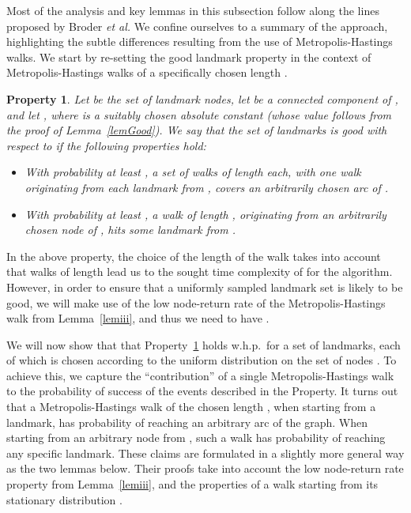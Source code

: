 \documentclass[11pt,a4paper]{article}
\newtheorem{property}{Property}
\newcommand{\Broder}{Broder \etal}
\newcommand{\etal}{\textsl{et al.}\xspace}
\renewcommand{\*}{\hspace*{5mm}}
\begin{document}
Most of the analysis and key lemmas in this subsection follow along the lines proposed by \Broder We confine ourselves to a summary of the approach, highlighting the subtle differences resulting from the use of Metropolis-Hastings walks. We start by re-setting the good landmark property in the context of Metropolis-Hastings walks  of a specifically chosen length .

\begin{property}\label{begood}
Let  be the set of  landmark nodes, let  be a connected component of , and let , where  is a suitably chosen absolute constant (whose value follows from the proof of Lemma~\ref{lemGood}). We say that the set of landmarks  is \emph{good with respect to } if the following properties hold:
\begin{itemize}
\item With probability at least , a set of  walks  of length  each, with one walk originating from each landmark from , covers an arbitrarily chosen arc of .
\item With probability at least , a walk  of length , originating from an arbitrarily chosen node of , hits some landmark from .
\end{itemize}
\end{property}

In the above property, the choice of the length  of the walk takes into account that walks of length  lead us to the sought time complexity of  for the algorithm. However, in order to ensure that a uniformly sampled landmark set is likely to be good, we will make use of the low node-return rate of the Metropolis-Hastings walk from Lemma~\ref{lemiii}, and thus we need to have .

We will now show that that Property~\ref{begood} holds w.h.p.\ for a set of landmarks, each of which is chosen according to the uniform distribution  on the set of nodes . To achieve this, we capture the ``contribution'' of a single Metropolis-Hastings walk to the probability of success of the events described in the Property. It turns out that a Metropolis-Hastings walk  of the chosen length , when starting from a landmark, has probability  of reaching an arbitrary arc of the graph. When starting from an arbitrary node from , such a walk has probability  of reaching any specific landmark. These claims are formulated in a slightly more general way as the two lemmas below. Their proofs take into account the low node-return rate property from Lemma~\ref{lemiii}, and the properties of a walk starting from its stationary distribution .
\end{document}
